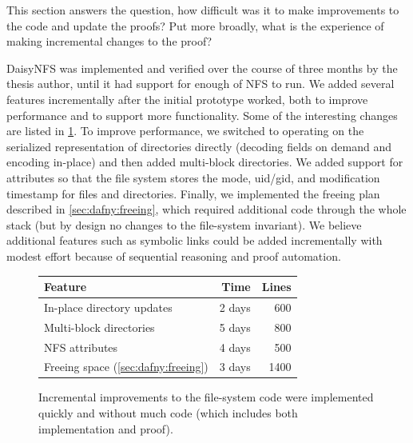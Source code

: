 This section answers the question, how difficult was it to make improvements to
the code and update the proofs? Put more broadly, what is the experience of
making incremental changes to the proof?

DaisyNFS was implemented and verified over the course of three months by the
thesis author, until it had support for enough of NFS to run. We
added several features incrementally after the initial prototype
worked, both to improve performance and to support more
functionality. Some of the interesting changes are listed in
\cref{fig:features}.  To improve performance, we switched to
operating on the serialized representation of directories directly
(decoding fields on demand and encoding in-place) and then added
multi-block directories.  We added support for attributes so that the file
system stores the mode, uid/gid, and modification timestamp for files and directories.
Finally, we implemented the freeing plan described
in \cref{sec:dafny:freeing}, which required additional code through the
whole stack (but by design no changes to the file-system invariant).
We believe additional features such as symbolic links
could be added incrementally with modest effort because
of sequential reasoning and proof automation.

\begin{figure}[ht!]
\begin{center}
\begin{tabular}{lrr}
  \toprule
  \textbf{Feature} & \textbf{Time} & \textbf{Lines} \\
  \midrule
  In-place directory updates & 2 days & 600\\
  Multi-block directories & 5 days & 800 \\
  NFS attributes & 4 days & 500 \\
  Freeing space (\cref{sec:dafny:freeing}) & 3 days & 1400\\
  \bottomrule
\end{tabular}
\end{center}
\caption[Effort for incremental improvements to the file system]%
{Incremental improvements to the file-system code were implemented
  quickly and without much code (which includes both implementation and proof).}
\label{fig:features}
\end{figure}

